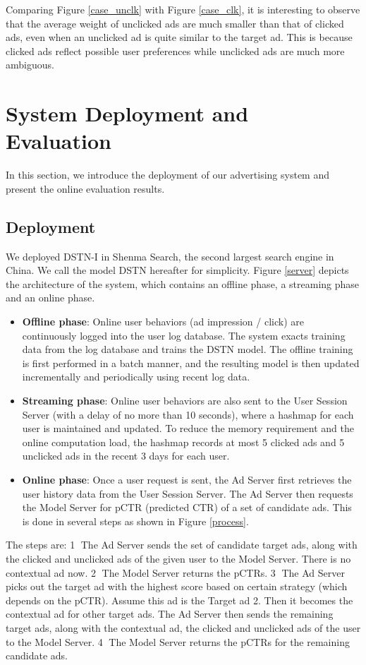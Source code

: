 \documentclass[sigconf]{acmart}
\begin{document}
Comparing Figure \ref{case_unclk} with Figure \ref{case_clk}, it is interesting to observe that the average weight of unclicked ads are much smaller than that of clicked ads, even when an unclicked ad is quite similar to the target ad. This is because clicked ads reflect possible user preferences while unclicked ads are much more ambiguous.

\section{System Deployment and Evaluation}
In this section, we introduce the deployment of our advertising system and present the online evaluation results.

\subsection{Deployment} \label{sec_deploy}
We deployed DSTN-I in Shenma Search, the second largest search engine in China. We call the model DSTN hereafter for simplicity. Figure \ref{server} depicts the architecture of the system, which contains an offline phase, a streaming phase and an online phase.
\begin{itemize}
\item \textbf{Offline phase}: Online user behaviors (ad impression / click) are continuously logged into the user log database. The system exacts training data from the log database and trains the DSTN model. The offline training is first performed in a batch manner, and the resulting model is then updated incrementally and periodically using recent log data.
\item \textbf{Streaming phase}: Online user behaviors are also sent to the User Session Server (with a delay of no more than 10 seconds), where a hashmap for each user is maintained and updated. To reduce the memory requirement and the online computation load, the hashmap records at most 5 clicked ads and 5 unclicked ads in the recent 3 days for each user.
\item \textbf{Online phase}: Once a user request is sent, the Ad Server first retrieves the user history data from the User Session Server. The Ad Server then requests the Model Server for pCTR (predicted CTR) of a set of candidate ads. This is done in several steps as shown in Figure \ref{process}.
\end{itemize}

The steps are: \textcircled{1} The Ad Server sends the set of candidate target ads, along with the clicked and unclicked ads of the given user to the Model Server. There is no contextual ad now. \textcircled{2} The Model Server returns the pCTRs. \textcircled{3} The Ad Server picks out the target ad with the highest score based on certain strategy (which depends on the pCTR). Assume this ad is the Target ad 2. Then it becomes the contextual ad for other target ads. The Ad Server then sends the remaining target ads, along with the contextual ad, the clicked and unclicked ads of the user to the Model Server. \textcircled{4} The Model Server returns the pCTRs for the remaining candidate ads.
\end{document}
